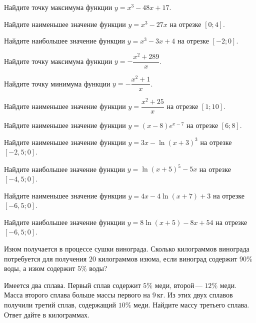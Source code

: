 
\begin{class}[number=1]
	\begin{listofex}
		\item Найдите точку максимума функции \(y=x^3-48x+17\).
		\item Найдите наименьшее значение функции \(y=x^3-27x\) на отрезке \([0;4]\).
		\item Найдите наибольшее значение функции \(y=x^3-3x+4\) на отрезке \([-2;0]\).
		\item Найдите точку максимума функции \(y=-\dfrac{ x^2+289 }{ x }\).
		\item Найдите точку минимума функции \(y=-\dfrac{ x^2+1 }{ x }\).
		\item Найдите наименьшее значение функции \(y=\dfrac{ x^2+25 }{ x }\) на отрезке \([1;10]\).
		\item Найдите наименьшее значение функции \(y=(x-8)e^{x-7}\) на отрезке \([6;8]\).
		\item Найдите наименьшее значение функции \(y=3x-\ln (x+3)^3\) на отрезке \([-2,5;0]\).
		\item Найдите наибольшее значение функции \(y=\ln (x+5)^5-5x\) на отрезке \([-4,5;0]\).
		\item Найдите наименьшее значение функции \(y=4x-4\ln (x+7)+3\) на отрезке \([-6,5;0]\).
		\item Найдите наибольшее значение функции \(y=8\ln (x+5)-8x+54\) на отрезке \([-6,5;0]\).
		\item Изюм получается в процессе сушки винограда. Сколько килограммов винограда потребуется для получения \(20\) килограммов изюма, если виноград содержит \(90\%\) воды, а изюм содержит \(5\%\) воды?
		\item Имеется два сплава. Первый сплав содержит \(5\%\) меди, второй --- \(12\%\) меди. Масса второго сплава больше массы первого на \(9\) кг. Из этих двух сплавов получили третий сплав, содержащий \(10\%\) меди. Найдите массу третьего сплава. Ответ дайте в килограммах.
		

\end{listofex}
\end{class}
